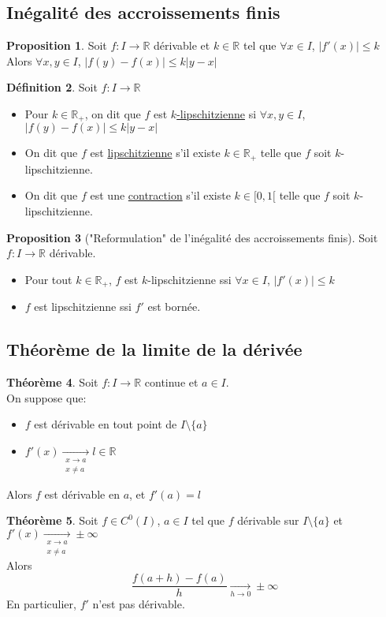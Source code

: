 \documentclass[10pt,a4paper]{article}
\theoremstyle{definition}
\newtheorem{proposition}{Proposition}[section]
\newtheorem{theorem}[proposition]{Théorème}
\newtheorem{definition}[proposition]{Définition}
\begin{document}
\subsection{Inégalité des accroissements finis}
\begin{proposition}
Soit $f: I \to \mathbb{R}$ dérivable et $k \in \mathbb{R}$ tel que $\forall x \in I$, $|f'(x)| \leq k$ \\
Alors $\forall x, y \in I$, $|f(y) - f(x)| \leq k |y - x|$
\end{proposition}
\begin{definition}
Soit $f: I \to \mathbb{R}$
\begin{itemize}
\item Pour $k \in \mathbb{R}_+$, on dit que $f$ est \uline{$k$-lipschitzienne} si $\forall x, y \in I$, $|f(y) - f(x)| \leq k|y - x|$
\item On dit que $f$ est \uline{lipschitzienne} s'il existe $k \in \mathbb{R}_+$ telle que $f$ soit $k$-lipschitzienne.
\item On dit que $f$ est une \uline{contraction} s'il existe $k \in [0, 1[$ telle que $f$ soit $k$-lipschitzienne.
\end{itemize}
\end{definition}
\begin{proposition}["Reformulation" de l'inégalité des accroissements finis]
Soit $f: I \to \mathbb{R}$ dérivable.
\begin{itemize}
\item Pour tout $k \in \mathbb{R}_+$, $f$ est $k$-lipschitzienne ssi $\forall x \in I$, $|f'(x)| \leq k$
\item $f$ est lipschitzienne ssi $f'$ est bornée.
\end{itemize}
\end{proposition}

\subsection{Théorème de la limite de la dérivée}
\begin{theorem}
Soit $f: I \to \mathbb{R}$ continue et $a \in I$. \\
On suppose que:
\begin{itemize}
\item $f$ est dérivable en tout point de $I \setminus \{ a \}$
\item $f'(x) \xrightarrow[\substack{x \to a \\ x \neq a}]{} l \in \mathbb{R}$
\end{itemize}
Alors $f$ est dérivable en $a$, et $f'(a) = l$
\end{theorem}
\begin{theorem}
Soit $f \in C^0(I)$, $a \in I$ tel que $f$ dérivable sur $I \setminus \{ a \}$ et $f'(x) \xrightarrow[\substack{x \to a \\ x \neq a}]{} \pm\infty$ \\
Alors
\[\frac{f(a + h) - f(a)}{h} \xrightarrow[h \to 0]{} \pm\infty\]
En particulier, $f'$ n'est pas dérivable.
\end{theorem}
\end{document}
